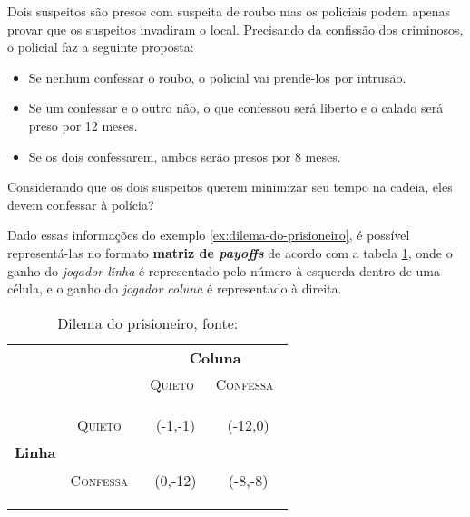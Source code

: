 \begin{ex}\label{ex:dilema-do-prisioneiro}
Dois suspeitos são presos com suspeita de roubo mas os policiais podem apenas provar que os suspeitos invadiram o local. Precisando da confissão dos criminosos, o policial faz a seguinte proposta:
\begin{itemize}
	\tightlist
	\item Se nenhum confessar o roubo, o policial vai prendê-los por intrusão.
	\item Se um confessar e o outro não, o que confessou será liberto e o calado será preso por 12 meses.
	\item Se os dois confessarem, ambos serão presos por 8 meses.
\end{itemize}
Considerando que os dois suspeitos querem minimizar seu tempo na cadeia, eles devem confessar à polícia?
\end{ex}

Dado essas informações do exemplo \ref{ex:dilema-do-prisioneiro}, é possível representá-las no formato {\bfseries matriz de \emph{payoffs}} de acordo com a tabela \ref{tab:dilema-prisioneiro}, onde o ganho do \emph{jogador linha} é representado pelo número à esquerda dentro de uma célula, e o ganho do \emph{jogador coluna} é representado à direita.

\begin{table}[ht]
\centering
\begin{tabular}{|c|c|c|c|}
	\cline{3-4}
	\multicolumn{1}{c}{} &  & \multicolumn{2}{c|}{{\bfseries Coluna}}\tabularnewline
	\cline{3-4}
	\multicolumn{1}{c}{} &  & {\scshape Quieto}\  & {\scshape Confessa}\ \tabularnewline
	\hline
	\multirow{2}{*}{\begin{turn}{90}
	{\bfseries Linha}
	\end{turn}} & \begin{turn}{90}
	{\scshape Quieto}\
	\end{turn} & {\Large(}{\Large -1,}{\Large -1)} & {\Large(}{\Large -12,}{\Large 0)}\tabularnewline
	\cline{2-4}
	 & \begin{turn}{90}
	{\scshape Confessa}\
	\end{turn} & {\Large(}{\Large 0,}{\Large -12)} & {\Large(}{\Large -8,}{\Large -8)}\tabularnewline
	\hline
\end{tabular}
\caption{Dilema do prisioneiro, fonte: \cite{spaniel_2011}}
\label{tab:dilema-prisioneiro}
\end{table}

